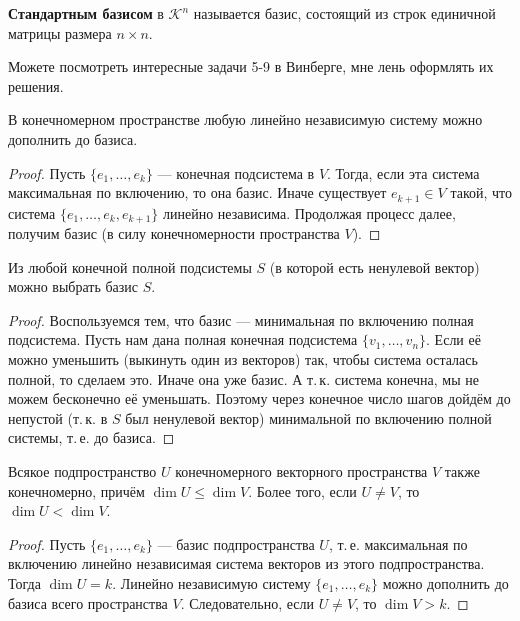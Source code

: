 \begin{definition}
    \textbf{Стандартным базисом} в $\mathcal{K}^n$ называется базис, состоящий из строк единичной матрицы размера $n \times n$.
\end{definition}

\begin{remark}
    Можете посмотреть интересные задачи 5-9 в Винберге, мне лень оформлять их решения.
\end{remark}

\begin{theorem}
    В конечномерном пространстве любую линейно независимую систему можно дополнить до базиса.
\end{theorem}

\begin{proof}
    Пусть $\{e_1, \ldots, e_k\}$ --- конечная подсистема в $V$. Тогда, если эта система максимальная по включению, то она базис. Иначе существует $e_{k + 1} \in V$ такой, что система $\{e_1, \ldots, e_k, e_{k + 1}\}$ линейно независима. Продолжая процесс далее, получим базис (в силу конечномерности пространства $V$).
\end{proof}

\begin{theorem}
    Из любой конечной полной подсистемы $S$ (в которой есть ненулевой вектор) можно выбрать базис $S$.
\end{theorem}

\begin{proof}
    Воспользуемся тем, что базис --- минимальная по включению полная подсистема. Пусть нам дана полная конечная подсистема $\{v_1, \ldots, v_n\}$. Если её можно уменьшить (выкинуть один из векторов) так, чтобы система осталась полной, то сделаем это. Иначе она уже базис. А т.\,к. система конечна, мы не можем бесконечно её уменьшать. Поэтому через конечное число шагов дойдём до непустой (т.\,к. в $S$ был ненулевой вектор) минимальной по включению полной системы, т.\,е. до базиса.
\end{proof}

\begin{theorem}
    Всякое подпространство $U$ конечномерного векторного пространства $V$ также конечномерно, причём $\dim U \leqslant \dim V$. Более того, если $U \ne V$, то $\dim U < \dim V$.
\end{theorem}

\begin{proof}
    Пусть $\{e_1, \ldots, e_k\}$ --- базис подпространства $U$, т.\,е. максимальная по включению линейно независимая система векторов из этого подпространства. Тогда $\dim U = k$. Линейно независимую систему $\{e_1, \ldots, e_k\}$ можно дополнить до базиса всего пространства $V$. Следовательно, если $U \ne V$, то $\dim V > k$.
\end{proof}

